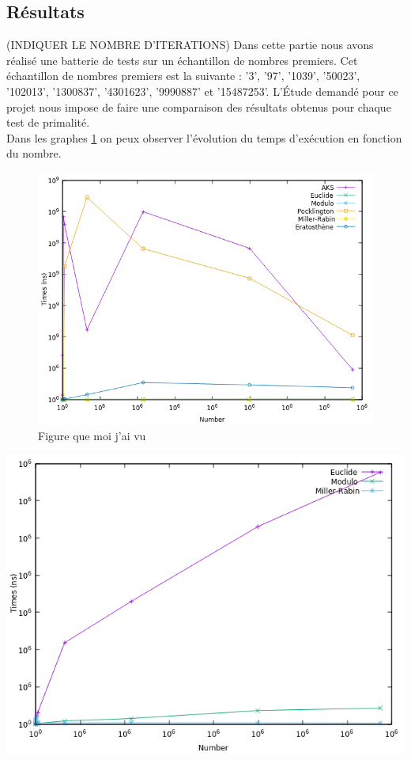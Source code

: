 		\subsection{Résultats} 		
		(INDIQUER LE NOMBRE D'ITERATIONS)
	Dans cette partie nous avons réalisé une batterie de tests sur un échantillon de nombres premiers. Cet échantillon de nombres premiers est la suivante : '3', '97', '1039', '50023', '102013', '1300837', '4301623', '9990887' et '15487253'. L’Étude demandé pour ce projet nous impose de faire une comparaison des résultats obtenus pour chaque test de primalité.\\
	Dans les graphes \ref{fg:fig1} on peux observer l'évolution du temps d'exécution en fonction du nombre.
\begin{figure}[!ht]	
		\begin{center}\includegraphics[scale=0.6]{result.png}\end{center}
		\caption{Figure que moi j'ai vu}
		\label{fg:fig1}
	\end{figure}
		\begin{center}\includegraphics[scale=0.6]{result2.png}\end{center}
	
